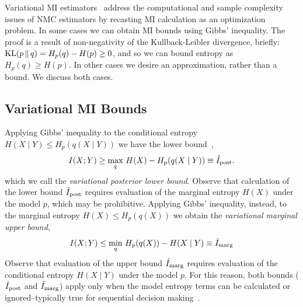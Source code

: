 Variational MI estimators~\cite{poole2019variational} address the
computational and sample complexity issues of NMC estimators by
recasting MI calculation as an optimization problem.  In some cases we
can obtain MI bounds using Gibbs' inequality.  The proof is a result
of non-negativity of the Kullback-Leibler divergence, briefly:
$\mathrm{KL}(p\,\|\,q) = H_p(q) - H(p) \geq 0$, and so we can bound entropy as
$H_p(q) \geq H(p)$.  In other cases we desire an approximation, rather
than a bound.  We discuss both cases.

\subsection{Variational MI Bounds}
Applying Gibbs' inequality to the conditional entropy $H(X \mid Y)
\leq H_p(q(X \mid Y))$ we have the lower
bound~\cite{agakov2004algorithm},
\begin{equation}\label{eq:mi_post}
  I(X;Y) \geq \max_q \, H(X) - H_p( q(X \mid Y) ) \equiv \hat{I}_{\text{post}}.
\end{equation}
which we call the \emph{variational posterior lower bound}.  Observe
that calculation of the lower bound $\hat{I}_{\text{post}}$ requires evaluation of
the marginal entropy $H(X)$ under the model $p$, which may be
prohibitive.  Applying Gibbs' inequality, instead, to the marginal
entropy $H(X) \leq H_p(q(X))$ we obtain the \emph{variational marginal
  upper bound},
\begin{equation}\label{eq:mi_marg}
  I(X;Y) \leq \min_q \, H_p( q(X) ) - H(X \mid Y) \equiv \hat{I}_{\text{marg}}
\end{equation}
Observe that evaluation of the upper bound $\hat{I}_{\text{marg}}$ requires
evaluation of the conditional entropy \mbox{$H(X \mid Y)$} under the
model $p$.  For this reason, both bounds ($\hat{I}_{\text{post}}$ and $\hat{I}_{\text{marg}}$) apply
only when the model entropy terms can be calculated or
ignored--typically true for sequential decision
making~\cite{pacheco2019variational, Foster2019, foster2020unified,
  agakov2004algorithm}.

